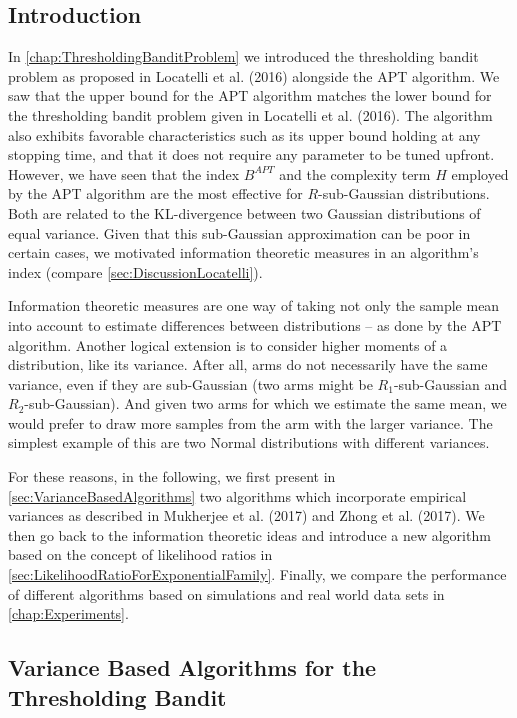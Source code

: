 \documentclass[11pt,]{article}
\begin{document}
\subsection{\texorpdfstring{Introduction
\label{sec:ExtensionsIntroduction}}{Introduction }}\label{introduction-1}

In \autoref{chap:ThresholdingBanditProblem} we introduced the
thresholding bandit problem as proposed in Locatelli et al. (2016)
alongside the APT algorithm. We saw that the upper bound for the APT
algorithm matches the lower bound for the thresholding bandit problem
given in Locatelli et al. (2016). The algorithm also exhibits favorable
characteristics such as its upper bound holding at any stopping time,
and that it does not require any parameter to be tuned upfront. However,
we have seen that the index \(B^{APT}\) and the complexity term \(H\)
employed by the APT algorithm are the most effective for
\(R\)-sub-Gaussian distributions. Both are related to the KL-divergence
between two Gaussian distributions of equal variance. Given that this
sub-Gaussian approximation can be poor in certain cases, we motivated
information theoretic measures in an algorithm's index (compare
\autoref{sec:DiscussionLocatelli}).

Information theoretic measures are one way of taking not only the sample
mean into account to estimate differences between distributions -- as
done by the APT algorithm. Another logical extension is to consider
higher moments of a distribution, like its variance. After all, arms do
not necessarily have the same variance, even if they are sub-Gaussian
(two arms might be \(R_1\)-sub-Gaussian and \(R_2\)-sub-Gaussian). And
given two arms for which we estimate the same mean, we would prefer to
draw more samples from the arm with the larger variance. The simplest
example of this are two Normal distributions with different variances.

For these reasons, in the following, we first present in
\autoref{sec:VarianceBasedAlgorithms} two algorithms which incorporate
empirical variances as described in Mukherjee et al. (2017) and Zhong et
al. (2017). We then go back to the information theoretic ideas and
introduce a new algorithm based on the concept of likelihood ratios in
\autoref{sec:LikelihoodRatioForExponentialFamily}. Finally, we compare
the performance of different algorithms based on simulations and real
world data sets in \autoref{chap:Experiments}.

\subsection{\texorpdfstring{Variance Based Algorithms for the
Thresholding Bandit
\label{sec:VarianceBasedAlgorithms}}{Variance Based Algorithms for the Thresholding Bandit }}\label{variance-based-algorithms-for-the-thresholding-bandit}
\end{document}
